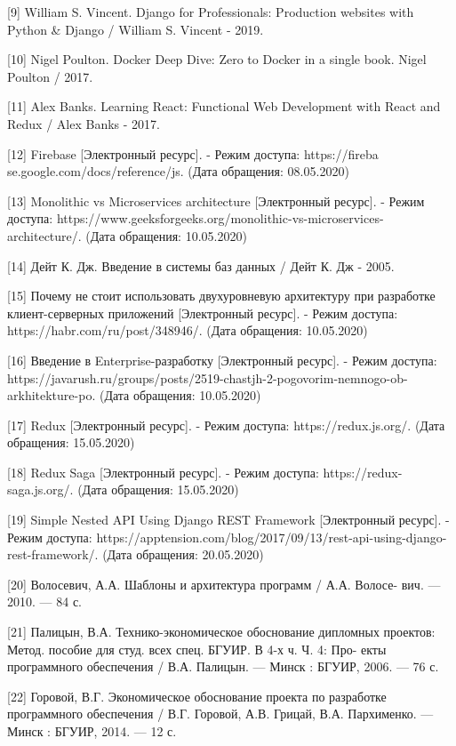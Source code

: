 [9] William S. Vincent. Django for Professionals: Production websites with Python \& Django / William S. Vincent - 2019.

[10] Nigel Poulton. Docker Deep Dive: Zero to Docker in a single book. Nigel Poulton / 2017.


[11] Alex Banks. Learning React: Functional Web Development with React and Redux / Alex Banks - 2017.

[12] Firebase [Электронный ресурс]. - Режим доступа: https://fireba  \linebreak se.google.com/docs/reference/js. (Дата обращения: 08.05.2020)

[13] Monolithic vs Microservices architecture [Электронный ресурс]. - Режим доступа: https://www.geeksforgeeks.org/monolithic-vs-microservices-architecture/. (Дата обращения: 10.05.2020)

[14] Дейт К. Дж. Введение в системы баз данных / Дейт К. Дж - 2005.

[15] Почему не стоит использовать двухуровневую архитектуру при разработке клиент-серверных приложений [Электронный ресурс]. - Режим доступа: https://habr.com/ru/post/348946/. (Дата обращения: 10.05.2020)

[16] Введение в Enterprise-разработку [Электронный ресурс]. - Режим доступа: https://javarush.ru/groups/posts/2519-chastjh-2-pogovorim-nemnogo-ob-arkhitekture-po. (Дата обращения: 10.05.2020)

[17] Redux [Электронный ресурс]. - Режим доступа: https://redux.js.org/. (Дата обращения: 15.05.2020)

[18] Redux Saga [Электронный ресурс]. - Режим доступа: https://redux-saga.js.org/. (Дата обращения: 15.05.2020)

[19] Simple Nested API Using Django REST Framework [Электронный ресурс]. - Режим доступа: https://apptension.com/blog/2017/09/13/rest-api-using-django-rest-framework/. (Дата обращения: 20.05.2020)

[20] Волосевич, А.А. Шаблоны и архитектура программ / А.А. Волосе- вич. — 2010. — 84 с.

[21] Палицын, В.А. Технико-экономическое обоснование дипломных проектов: Метод. пособие для студ. всех спец. БГУИР. В 4-х ч. Ч. 4: Про- екты программного обеспечения / В.А. Палицын. — Минск : БГУИР, 2006. — 76 с.

[22] Горовой, В.Г. Экономическое обоснование проекта по разработке программного обеспечения / В.Г. Горовой, А.В. Грицай, В.А. Пархименко. — Минск : БГУИР, 2014. — 12 с.
